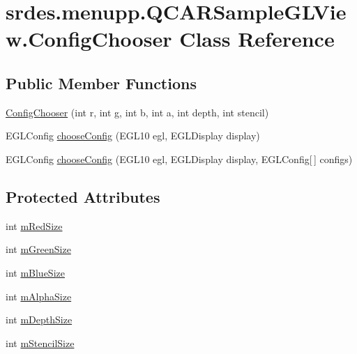 \hypertarget{classsrdes_1_1menupp_1_1_q_c_a_r_sample_g_l_view_1_1_config_chooser}{\section{srdes.\-menupp.\-Q\-C\-A\-R\-Sample\-G\-L\-View.\-Config\-Chooser \-Class \-Reference}
\label{classsrdes_1_1menupp_1_1_q_c_a_r_sample_g_l_view_1_1_config_chooser}
}
\subsection*{\-Public \-Member \-Functions}
\begin{DoxyCompactItemize}
\item 
\hyperlink{classsrdes_1_1menupp_1_1_q_c_a_r_sample_g_l_view_1_1_config_chooser_ad253ee49ccc6fce1d097c7c84c672d2a}{\-Config\-Chooser} (int r, int g, int b, int a, int depth, int stencil)
\item 
\-E\-G\-L\-Config \hyperlink{classsrdes_1_1menupp_1_1_q_c_a_r_sample_g_l_view_1_1_config_chooser_a102c0f944ed09e9cdaa1fb709ddbaa87}{choose\-Config} (\-E\-G\-L10 egl, \-E\-G\-L\-Display display)
\item 
\-E\-G\-L\-Config \hyperlink{classsrdes_1_1menupp_1_1_q_c_a_r_sample_g_l_view_1_1_config_chooser_a244fe7eefa8959380360fec4286833f7}{choose\-Config} (\-E\-G\-L10 egl, \-E\-G\-L\-Display display, \-E\-G\-L\-Config\mbox{[}$\,$\mbox{]} configs)
\end{DoxyCompactItemize}
\subsection*{\-Protected \-Attributes}
\begin{DoxyCompactItemize}
\item 
int \hyperlink{classsrdes_1_1menupp_1_1_q_c_a_r_sample_g_l_view_1_1_config_chooser_a190f97a18e285e263dccdabe1109280a}{m\-Red\-Size}
\item 
int \hyperlink{classsrdes_1_1menupp_1_1_q_c_a_r_sample_g_l_view_1_1_config_chooser_a4fe7b0adba0f9f67fb73be8656b90326}{m\-Green\-Size}
\item 
int \hyperlink{classsrdes_1_1menupp_1_1_q_c_a_r_sample_g_l_view_1_1_config_chooser_ac90e4bbf6ee84c260398b762cf603fc4}{m\-Blue\-Size}
\item 
int \hyperlink{classsrdes_1_1menupp_1_1_q_c_a_r_sample_g_l_view_1_1_config_chooser_afdcc280bef64a97032c36b48f25eee20}{m\-Alpha\-Size}
\item 
int \hyperlink{classsrdes_1_1menupp_1_1_q_c_a_r_sample_g_l_view_1_1_config_chooser_aca8ef151f36f753aba30b82be8fc4289}{m\-Depth\-Size}
\item 
int \hyperlink{classsrdes_1_1menupp_1_1_q_c_a_r_sample_g_l_view_1_1_config_chooser_ae49c4d9a6f5c2e63be57b8a755548398}{m\-Stencil\-Size}
\end{DoxyCompactItemize}
